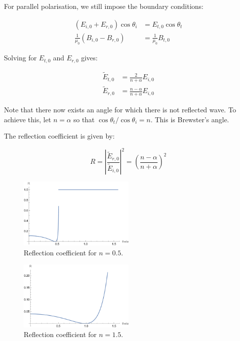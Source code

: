 \documentclass[12pt]{article}
\begin{document}
For parallel polarisation, we still impose the boundary conditions:

\begin{equation}
\begin{split}
    (E_{i, 0} + E_{r, 0}) \cos{\theta_{i}} &= E_{t, 0} \cos{\theta_{t}} \\
    \frac{1}{\mu_{0}} (B_{i, 0} - B_{r, 0}) &= \frac{1}{\mu_{0}} B_{t, 0}
\end{split}
\end{equation}

Solving for $E_{t, 0}$ and $E_{r, 0}$ gives:

\begin{equation}
\begin{split}
    \tilde{E}_{t, 0} &= \frac{2}{n + \alpha} E_{i, 0} \\
    \tilde{E}_{r, 0} &= \frac{n - \alpha}{n + \alpha} E_{i, 0}
\end{split}
\end{equation}

Note that there now exists an angle for which there is not reflected wave. To achieve this, let $n = \alpha$ so that $\cos{\theta_{t}}/\cos{\theta_{i}} = n$. This is Brewster's angle.

The reflection coefficient is given by:

\begin{equation}
    R = \left\lvert \frac{\tilde{E}_{r, 0}}{\tilde{E}_{i, 0}} \right\rvert^{2} = \left( \frac{n - \alpha}{n + \alpha} \right)^{2}
\end{equation}

\begin{figure}[htt]
    \centering
    \includegraphics[width=0.5\textwidth]{../plots/electro_3_3_c.png}
    \caption{Reflection coefficient for $n = 0.5$.}
    \label{fig:reflection_coefficient_3}
\end{figure}

\begin{figure}[htt]
    \centering
    \includegraphics[width=0.5\textwidth]{../plots/electro_3_3_d.png}
    \caption{Reflection coefficient for $n = 1.5$.}
    \label{fig:reflection_coefficient_4}
\end{figure}
\end{document}
